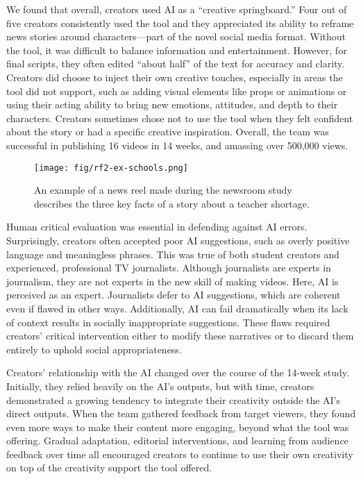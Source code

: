 We found that overall, creators used AI as a “creative springboard.”
Four out of five creators consistently used the tool and they appreciated its ability to reframe news stories around characters---part of the novel social media format. 
Without the tool, it was difficult to balance information and entertainment. 
However, for final scripts, they often edited “about half” of the text for accuracy and clarity.
Creators did choose to inject their own creative touches, especially in areas the tool did not support, such as adding visual elements like props or animations or using their acting ability to bring new emotions, attitudes, and depth to their characters.
Creators sometimes chose not to use the tool when they felt confident about the story or had a specific creative inspiration. 
Overall, the team was successful in publishing 16 videos in 14 weeks, and amassing over 500,000 views.

\begin{figure*}
\centering
\texttt{[image: fig/rf2-ex-schools.png]}
\caption{
An example of a news reel made during the newsroom study describes the three key facts of a story about a teacher shortage. 
}
\label{fig:rf2-ex-schools}
\end{figure*}

Human critical evaluation was essential in defending against AI errors.
Surprisingly, creators often accepted poor AI suggestions, such as overly positive language and meaningless phrases.  
This was true of both student creators and experienced, professional TV journalists.
Although journalists are experts in journalism, they are not experts in the new skill of making videos. Here, AI is perceived as an expert. Journalists defer to AI suggestions, which are coherent even if flawed in other ways.
Additionally, AI can fail dramatically when its lack of context results in socially inappropriate suggestions.
These flaws required creators’ critical intervention either to modify these narratives or to discard them entirely to uphold social appropriateness. 

Creators' relationship with the AI changed over the course of the 14-week study.
Initially, they relied heavily on the AI's outputs, but with time, creators demonstrated a growing tendency to integrate their creativity outside the AI’s direct outputs.
When the team gathered feedback from target viewers, they found even more ways to make their content more engaging, beyond what the tool was offering.
Gradual adaptation, editorial interventions, and learning from audience feedback over time all encouraged creators to continue to use their own creativity on top of the creativity support the tool offered.
